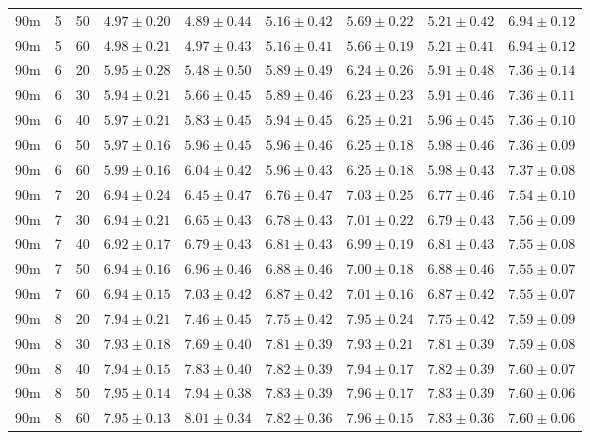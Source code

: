 \begin{table}
\begin{center}
\begin{tabular}{ccc|c|ccccc}
  90m &   5 &  50 & $4.97 \pm 0.20$ & $4.89 \pm 0.44$ & $5.16 \pm 0.42$ & $5.69 \pm 0.22$ & $5.21 \pm 0.42$ & $6.94 \pm 0.12$ \\ 
  90m &   5 &  60 & $4.98 \pm 0.21$ & $4.97 \pm 0.43$ & $5.16 \pm 0.41$ & $5.66 \pm 0.19$ & $5.21 \pm 0.41$ & $6.94 \pm 0.12$ \\ 
   \hline
90m &   6 &  20 & $5.95 \pm 0.28$ & $5.48 \pm 0.50$ & $5.89 \pm 0.49$ & $6.24 \pm 0.26$ & $5.91 \pm 0.48$ & $7.36 \pm 0.14$ \\ 
  90m &   6 &  30 & $5.94 \pm 0.21$ & $5.66 \pm 0.45$ & $5.89 \pm 0.46$ & $6.23 \pm 0.23$ & $5.91 \pm 0.46$ & $7.36 \pm 0.11$ \\ 
  90m &   6 &  40 & $5.97 \pm 0.21$ & $5.83 \pm 0.45$ & $5.94 \pm 0.45$ & $6.25 \pm 0.21$ & $5.96 \pm 0.45$ & $7.36 \pm 0.10$ \\ 
  90m &   6 &  50 & $5.97 \pm 0.16$ & $5.96 \pm 0.45$ & $5.96 \pm 0.46$ & $6.25 \pm 0.18$ & $5.98 \pm 0.46$ & $7.36 \pm 0.09$ \\ 
  90m &   6 &  60 & $5.99 \pm 0.16$ & $6.04 \pm 0.42$ & $5.96 \pm 0.43$ & $6.25 \pm 0.18$ & $5.98 \pm 0.43$ & $7.37 \pm 0.08$ \\ 
   \hline
90m &   7 &  20 & $6.94 \pm 0.24$ & $6.45 \pm 0.47$ & $6.76 \pm 0.47$ & $7.03 \pm 0.25$ & $6.77 \pm 0.46$ & $7.54 \pm 0.10$ \\ 
  90m &   7 &  30 & $6.94 \pm 0.21$ & $6.65 \pm 0.43$ & $6.78 \pm 0.43$ & $7.01 \pm 0.22$ & $6.79 \pm 0.43$ & $7.56 \pm 0.09$ \\ 
  90m &   7 &  40 & $6.92 \pm 0.17$ & $6.79 \pm 0.43$ & $6.81 \pm 0.43$ & $6.99 \pm 0.19$ & $6.81 \pm 0.43$ & $7.55 \pm 0.08$ \\ 
  90m &   7 &  50 & $6.94 \pm 0.16$ & $6.96 \pm 0.46$ & $6.88 \pm 0.46$ & $7.00 \pm 0.18$ & $6.88 \pm 0.46$ & $7.55 \pm 0.07$ \\ 
  90m &   7 &  60 & $6.94 \pm 0.15$ & $7.03 \pm 0.42$ & $6.87 \pm 0.42$ & $7.01 \pm 0.16$ & $6.87 \pm 0.42$ & $7.55 \pm 0.07$ \\ 
   \hline
90m &   8 &  20 & $7.94 \pm 0.21$ & $7.46 \pm 0.45$ & $7.75 \pm 0.42$ & $7.95 \pm 0.24$ & $7.75 \pm 0.42$ & $7.59 \pm 0.09$ \\ 
  90m &   8 &  30 & $7.93 \pm 0.18$ & $7.69 \pm 0.40$ & $7.81 \pm 0.39$ & $7.93 \pm 0.21$ & $7.81 \pm 0.39$ & $7.59 \pm 0.08$ \\ 
  90m &   8 &  40 & $7.94 \pm 0.15$ & $7.83 \pm 0.40$ & $7.82 \pm 0.39$ & $7.94 \pm 0.17$ & $7.82 \pm 0.39$ & $7.60 \pm 0.07$ \\ 
  90m &   8 &  50 & $7.95 \pm 0.14$ & $7.94 \pm 0.38$ & $7.83 \pm 0.39$ & $7.96 \pm 0.17$ & $7.83 \pm 0.39$ & $7.60 \pm 0.06$ \\ 
  90m &   8 &  60 & $7.95 \pm 0.13$ & $8.01 \pm 0.34$ & $7.82 \pm 0.36$ & $7.96 \pm 0.15$ & $7.83 \pm 0.36$ & $7.60 \pm 0.06$ \\ 
   \hline
\end{tabular}
\end{center}
\end{table}


